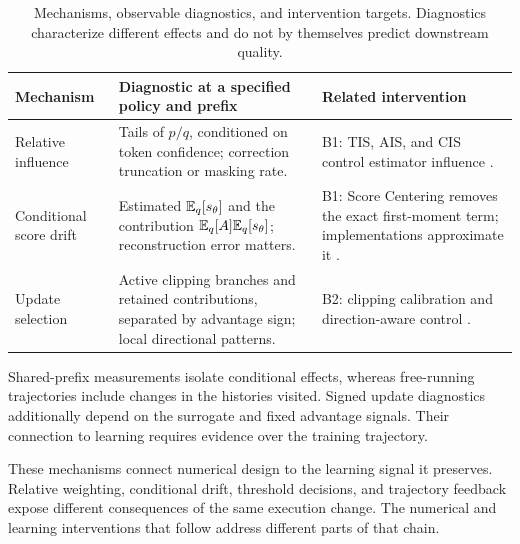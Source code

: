 \begin{table}[!htbp]
\centering\small\setlength{\tabcolsep}{4pt}
\caption{Mechanisms, observable diagnostics, and intervention targets. Diagnostics characterize different effects and do not by themselves predict downstream quality.}\label{tab:diagnostics}
\begin{tabularx}{\linewidth}{@{}P{28mm}YY@{}}\toprule
{} \textbf{Mechanism} & \textbf{Diagnostic at a specified policy and prefix} & \textbf{Related intervention}\\\midrule
Relative influence & Tails of $p/q$, conditioned on token confidence; correction truncation or masking rate. & B1: TIS, AIS, and CIS control estimator influence \citep{flashrl,ais,cis}.\\[5pt]
Conditional score drift & Estimated $\mathbb{E}_q[s_\theta]$ and the contribution $\mathbb{E}_q[A]\mathbb{E}_q[s_\theta]$; reconstruction error matters. & B1: Score Centering removes the exact first-moment term; implementations approximate it \citep{score}.\\[5pt]
Update selection & Active clipping branches and retained contributions, separated by advantage sign; local directional patterns. & B2: clipping calibration and direction-aware control \citep{fullfp8,triage}.\\\bottomrule
\end{tabularx}
\end{table}

Shared-prefix measurements isolate conditional effects, whereas free-running trajectories include changes in the histories visited. Signed update diagnostics additionally depend on the surrogate and fixed advantage signals. Their connection to learning requires evidence over the training trajectory.


These mechanisms connect numerical design to the learning signal it preserves. Relative weighting, conditional drift, threshold decisions, and trajectory feedback expose different consequences of the same execution change. The numerical and learning interventions that follow address different parts of that chain.

